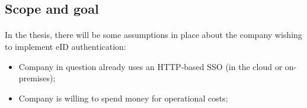 \subsection{Scope and goal}
\paragraph{}

In the thesis, there will be some assumptions in place about the company wishing to implement eID authentication:

\begin{itemize}
    \item Company in question already uses an HTTP-based SSO (in the cloud or on-premises);
    \item Company is willing to spend money for operational costs;
\end{itemize}












